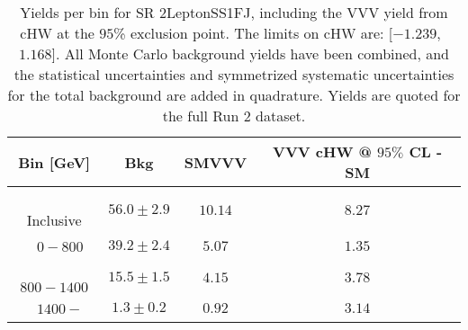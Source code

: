 \begin{table}[!htbp]
    \small
    \center
    \begin{tabular}{c||c|c|c}
    Bin [GeV] & Bkg & SMVVV & \pbox{20cm}{VVV \\ cHW @ $95\%$ CL - SM \\ }\\
    \hline
    \pbox{20cm}{ ~ \\Inclusive\\ } & $56.0 \pm 2.9$ & $10.14$ & $8.27$\\
    \hline
    \pbox{20cm}{ ~ \\$0-800$\\ } & $39.2 \pm 2.4$ & $5.07$ & $1.35$\\
    \hline
    \pbox{20cm}{ ~ \\$800-1400$\\ } & $15.5 \pm 1.5$ & $4.15$ & $3.78$\\
    \hline
    \pbox{20cm}{ ~ \\$1400-$\\ } & $1.3 \pm 0.2$ & $0.92$ & $3.14$\\
\end{tabular}
    \caption{Yields per bin for SR 2LeptonSS1FJ, including the VVV yield from cHW at the $95$\% exclusion point. The limits on cHW are: [$-1.239$,~$1.168$]. All Monte Carlo background yields have been combined, and the statistical uncertainties and symmetrized systematic uncertainties for the total background are added in quadrature. Yields are quoted for the full Run 2 dataset.}
    \label{tab:2LeptonSS1FJ$binssignal}
\end{table}
